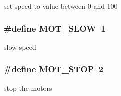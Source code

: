 set speed to value between 0 and 100 \hypertarget{group__motor__commands_gab1d9e4b8515c9040e93ba9edcdb843a3}{
\subsubsection[{M\-O\-T\-\_\-\-S\-L\-O\-W}]{\setlength{\rightskip}{0pt plus 5cm}\#define M\-O\-T\-\_\-\-S\-L\-O\-W~1}}\label{group__motor__commands_gab1d9e4b8515c9040e93ba9edcdb843a3}
slow speed \hypertarget{group__motor__commands_gaf57de7232e513663b5793fce23b2795a}{
\subsubsection[{M\-O\-T\-\_\-\-S\-T\-O\-P}]{\setlength{\rightskip}{0pt plus 5cm}\#define M\-O\-T\-\_\-\-S\-T\-O\-P~2}}\label{group__motor__commands_gaf57de7232e513663b5793fce23b2795a}
stop the motors 
